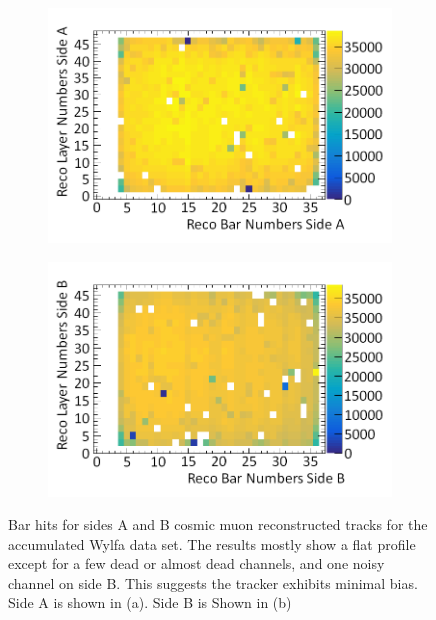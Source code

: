 \begin{figure}[!h]
\centering
\begin{subfigure}{.5\textwidth}
  \centering
  \includegraphics[width=\linewidth]{Chapter6/Figs/Raster/wylfaSideAHitsMedText.png}
  \captionsetup{width=.9\linewidth}
  \caption{}
  \label{subFig:wylfaSideAHits}
\end{subfigure}%
\begin{subfigure}{.5\textwidth}
  \centering
\includegraphics[width=\linewidth]{Chapter6/Figs/Raster/wylfaSideBHitsMedText.png}
  \captionsetup{width=.9\linewidth}
  \caption{}
  \label{subFig:wylfaSideBHits}
\end{subfigure}
\caption[Cosmic muon bar hits when biased timing cycles are excluded.]{Bar hits for sides A and B cosmic muon reconstructed tracks for the accumulated Wylfa data set. The results mostly show a flat profile except for a few dead or almost dead channels, and one noisy channel on side B. This suggests the tracker exhibits minimal bias. Side A is shown in (a). Side B is Shown in (b)}
\label{fig:wylfaSideABHits}
\end{figure}


